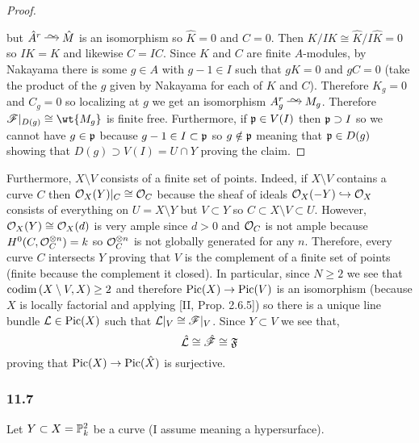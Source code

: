 \documentclass[12pt]{article}
\begin{document}
\begin{enumerate}
\begin{proof}
\begin{center}
\end{center} 
but $\hat{A}^r \iso \hat{M}$ is an isomorphism so $\hat{K} = 0$ and $\hat{C} = 0$. Then $K / IK \cong \hat{K} / I \hat{K} = 0$ so $I K = K$ and likewise $C = IC$. Since $K$ and $C$ are finite $A$-modules, by Nakayama there is some $g \in A$ with $g - 1 \in I$ such that $g K = 0$ and $g C = 0$ (take the product of the $g$ given by Nakayama for each of $K$ and $C$). Therefore $K_g = 0$ and $C_g = 0$ so localizing at $g$ we get an isomorphism $A^r_g \iso M_g$. Therefore $\F |_{D(g)} \cong \wt{M_g}$ is finite free. Furthermore, if $\p \in V(I)$ then $\p \supset I$ so we cannot have $g \in \p$ because $g - 1 \in I \subset \p$ so $g \notin \p$ meaning that $\p \in D(g)$ showing that $D(g) \supset V(I) = U \cap Y$ proving the claim.
\end{proof}

\noindent
Furthermore, $X \setminus V$ consists of a finite set of points. Indeed, if $X \setminus V$ contains a curve $C$ then $\struct{X}(Y) |_C \cong \struct{C}$ because the sheaf of ideals $\struct{X}(-Y) \embed \struct{X}$ consists of everything on $U = X \setminus Y$ but $V \subset Y$ so $C \subset X \setminus V \subset U$. However, $\struct{X}(Y) \cong \struct{X}(d)$ is very ample since $d > 0$ and $\struct{C}$ is not ample because $H^0(C, \struct{C}^{\ot n}) = k$ so $\struct{C}^{\ot n}$ is not globally generated for any $n$. Therefore, every curve $C$ intersects $Y$ proving that $V$ is the complement of a finite set of points (finite because the complement it closed). In particular, since $N \ge 2$ we see that $\codim{X \setminus V, X} \ge 2$ and therefore $\Pic{X} \to \Pic{V}$ is an isomorphism (because $X$ is locally factorial and applying [II, Prop. 2.6.5]) so there is a unique line bundle $\L \in \Pic{X}$ such that $\L|_V \cong \F|_V$. Since $Y \subset V$ we see that,
\[ \hat{\L} \cong \hat{\F} \cong \fF \]
proving that $\Pic{X} \to \Pic{\hat{X}}$ is surjective. 
\end{enumerate}

\subsubsection{11.7}

Let $Y \subset X = \P^2_k$ be a curve (I assume meaning a hypersurface). 
\end{document}
